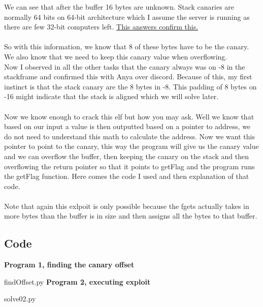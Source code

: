 \documentclass{article}
\begin{document}
We can see that after the buffer 16 bytes are unknown. Stack canaries are normally 64 bits on 64-bit architecture which I assume the server is running as there are few 32-bit computers left. \href{https://security.stackexchange.com/a/149136}{This answers confirm this.}\\ \\
So with this information, we know that 8 of these bytes have to be the canary. \\
We also know that we need to keep this canary value when overflowing. \\
Now I observed in all the other tasks that the canary always was on -8 in the stackframe and confirmed this with Anya over discord. Because of this, my first instinct is that the stack canary are the 8 bytes in -8. This padding of 8 bytes on -16 might indicate that the stack is aligned which we will solve later.
\\ \\
Now we know enough to crack this elf but how you may ask. Well we know that based on our input a value is then outputted based on a pointer to address, we do not need to understand this math to calculate the address. Now we want this pointer to point to the canary, this way the program will give us the canary value and we can overflow the buffer, then keeping the canary on the stack and then overflowing the return pointer so that it points to getFlag and the program runs the getFlag function. Here comes the code I used and then explanation of that code.
\\\\
Note that again this exlpoit is only possible because the fgets actually takes in more bytes than the buffer is in size and then assigns all the bytes to that buffer.
\subsection{Code}
\textbf{Program 1, finding the canary offset}

{findOffset.py}
\textbf{Program 2, executing exploit}

{solve02.py}
\end{document}
